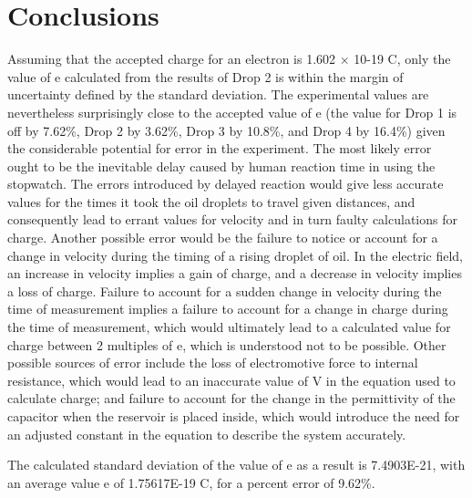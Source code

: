 \documentclass[11pt]{article}
\begin{document}
\section{Conclusions}

Assuming that the accepted charge for an electron is 1.602 × 10-19 C, only the value of e calculated from the results of Drop 2 is within the margin of uncertainty defined by the standard deviation. The experimental values are nevertheless surprisingly close to the accepted value of e (the value for Drop 1 is off by 7.62\%, Drop 2 by 3.62\%, Drop 3 by 10.8\%, and Drop 4 by 16.4\%) given the considerable potential for error in the experiment. The most likely error ought to be the inevitable delay caused by human reaction time in using the stopwatch. The errors introduced by delayed reaction would give less accurate values for the times it took the oil droplets to travel given distances, and consequently lead to errant values for velocity and in turn faulty calculations for charge. Another possible error would be the failure to notice or account for a change in velocity during the timing of a rising droplet of oil. In the electric field, an increase in velocity implies a gain of charge, and a decrease in velocity implies a loss of charge. Failure to account for a sudden change in velocity during the time of measurement implies a failure to account for a change in charge during the time of measurement, which would ultimately lead to a calculated value for charge between 2 multiples of e, which is understood not to be possible. Other possible sources of error include the loss of electromotive force to internal resistance, which would lead to an inaccurate value of V in the equation used to calculate charge; and failure to account for the change in the permittivity of the capacitor when the reservoir is placed inside, which would introduce the need for an adjusted constant in the equation to describe the system accurately.

The calculated standard deviation of the value of e as a result is 7.4903E-21, with an average value e of 1.75617E-19 C, for a percent error of 9.62\%.
\end{document}
